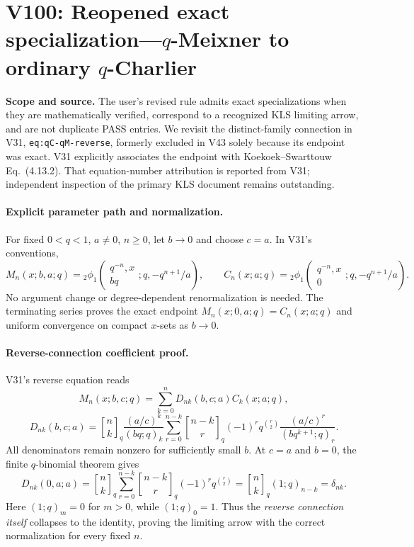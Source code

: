 \documentclass[11pt]{article}
\begin{document}
\section{V100: Reopened exact specialization---$q$-Meixner to ordinary $q$-Charlier}
\noindent\textbf{Scope and source.} The user's revised rule admits exact specializations when they are mathematically verified, correspond to a recognized KLS limiting arrow, and are not duplicate PASS entries. We revisit the distinct-family connection in V31, \texttt{eq:qC-qM-reverse}, formerly excluded in V43 solely because its endpoint was exact. V31 explicitly associates the endpoint with Koekoek--Swarttouw Eq.~(4.13.2). That equation-number attribution is reported from V31; independent inspection of the primary KLS document remains outstanding.

\paragraph{Explicit parameter path and normalization.} For fixed $0<q<1$, $a\ne0$, $n\ge0$, let $b\to0$ and choose $c=a$. In V31's conventions,
\[
 M_n(x;b,a;q)={}_2\phi_1\!\left(\begin{matrix}q^{-n},x\\bq\end{matrix};q,-q^{n+1}/a\right),\qquad
 C_n(x;a;q)={}_2\phi_1\!\left(\begin{matrix}q^{-n},x\\0\end{matrix};q,-q^{n+1}/a\right).
\]
No argument change or degree-dependent renormalization is needed. The terminating series proves the exact endpoint $M_n(x;0,a;q)=C_n(x;a;q)$ and uniform convergence on compact $x$-sets as $b\to0$.

\paragraph{Reverse-connection coefficient proof.} V31's reverse equation reads
\[
 M_n(x;b,c;q)=\sum_{k=0}^n D_{nk}(b,c;a)C_k(x;a;q),
\]
\[
 D_{nk}(b,c;a)={n\brack k}_q\frac{(a/c)^k}{(bq;q)_k}
 \sum_{r=0}^{n-k}{n-k\brack r}_q(-1)^rq^{\binom r2}
 \frac{(a/c)^r}{(bq^{k+1};q)_r}.
\]
All denominators remain nonzero for sufficiently small $b$. At $c=a$ and $b=0$, the finite $q$-binomial theorem gives
\[
 D_{nk}(0,a;a)={n\brack k}_q\sum_{r=0}^{n-k}{n-k\brack r}_q(-1)^rq^{\binom r2}
 ={n\brack k}_q(1;q)_{n-k}=\delta_{nk}.
\]
Here $(1;q)_m=0$ for $m>0$, while $(1;q)_0=1$. Thus the \emph{reverse connection itself} collapses to the identity, proving the limiting arrow with the correct normalization for every fixed $n$.
\end{document}
